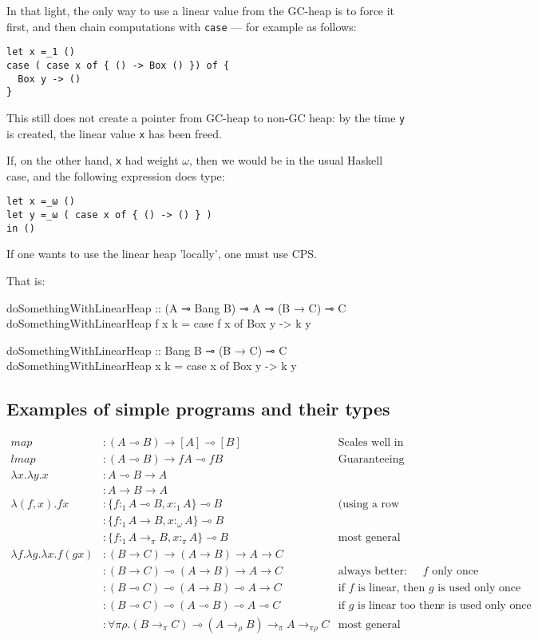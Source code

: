 \documentclass[11pt]{article}
\begin{document}
In that light, the only way to use a linear value from the GC-heap is
to force it first, and then chain computations with \verb|case| --- for
example as follows:
\begin{verbatim}
let x =_1 ()
case ( case x of { () -> Box () }) of {
  Box y -> ()
}
\end{verbatim}
This still does not create a pointer from GC-heap to non-GC heap: by the
time \verb|y| is created, the linear value \verb|x| has been freed.

If, on the other hand, \verb|x| had weight $ω$, then we would be in the
usual Haskell case, and the following expression does type:
\begin{verbatim}
let x =_ω ()
let y =_ω ( case x of { () -> () } )
in ()
\end{verbatim}

If one wants to use the linear heap 'locally', one must use CPS.

That is:

doSomethingWithLinearHeap :: (A ⊸ Bang B) ⊸ A ⊸ (B → C) ⊸ C
doSomethingWithLinearHeap f x k = case f x of
  Box y -> k y

doSomethingWithLinearHeap :: Bang B ⊸ (B → C) ⊸ C
doSomethingWithLinearHeap x k = case x of
  Box y -> k y

\subsection{Examples of simple programs and their types}

\hspace{-4cm}\begin{minipage}{\textwidth}
\begin{align*}
map & : (A ⊸ B) → [A] ⊸ [B] & \text{Scales well in unrestricted contexts}\\
lmap & : (A ⊸ B) → f A ⊸ f B & \text{Guaranteeing that no element is lost} \\
λx. λy. x & : A ⊸ B → A \\
          & : A → B → A \\
λ(f,x). f x & : \{f :_1 A ⊸ B, x :_1 A\} ⊸ B & \text{(using a row type for concision)}\\
            & : \{f :_1 A → B, x :_ω A\} ⊸ B \\
            & : \{f :_1 A →_π B, x :_π A\} ⊸ B & \text{most general type} \\ 
λf. λg. λx. f (g x) & : (B → C) → (A → B) → A → C \\
                    & : (B → C) ⊸ (A → B) → A → C & \text {always better: comp uses $f$  only once} \\
                    & : (B ⊸ C) ⊸ (A → B) ⊸ A → C & \text {if $f$ is linear, then $g$ is used only once} \\
                    & : (B ⊸ C) ⊸ (A ⊸ B) ⊸ A ⊸ C & \text {if $g$ is linear too then $x$ is used only once} \\
                    & : ∀ π ρ. (B →_π C) ⊸ (A →_ρ B) →_π A →_{πρ} C & \text{most general type} \\
\end{align*}
\end{minipage}
\end{document}
